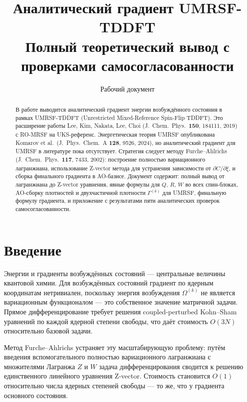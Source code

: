 \documentclass[11pt, a4paper]{article}
\title{\Large\bfseries Аналитический градиент UMRSF-TDDFT\\[4pt]
       \large Полный теоретический вывод с проверками самосогласованности}
\author{Рабочий документ}
\date{}
\theoremstyle{definition}
\begin{document}
\maketitle

\begin{abstract}
\noindent
В работе выводится аналитический градиент энергии возбуждённого состояния в рамках UMRSF-TDDFT (Unrestricted Mixed-Reference Spin-Flip TDDFT). Это расширение работы Lee, Kim, Nakata, Lee, Choi (J.\ Chem.\ Phys.\ \textbf{150}, 184111, 2019) с RO-MRSF на UKS-референс. Энергетическая теория UMRSF опубликована Komarov et al.\ (J.\ Phys.\ Chem.\ A \textbf{128}, 9526, 2024), но аналитический градиент для UMRSF в литературе пока отсутствует. Стратегия следует методу Furche--Ahlrichs (J.\ Chem.\ Phys.\ \textbf{117}, 7433, 2002): построение полностью вариационного лагранжиана, использование Z-vector метода для устранения зависимости от $\partial C/\partial\xi$, и сборка финального градиента в AO-базисе. Документ содержит: полный вывод от лагранжиана до Z-vector уравнения, явные формулы для $Q$, $R$, $W$ во всех спин-блоках, AO-сборку плотностей и двухчастичной плотности $\Gamma^{(k)}$ для UMRSF, финальную формулу градиента, и приложение с результатами пяти аналитических проверок самосогласованности.
\end{abstract}

\tableofcontents
\clearpage

\section{Введение}

Энергии и градиенты возбуждённых состояний — центральные величины квантовой химии. Для возбуждённых состояний градиент по ядерным координатам нетривиален, поскольку энергия возбуждения $\Omega^{(k)}$ не является вариационным функционалом — это собственное значение матричной задачи. Прямое дифференцирование требует решения coupled-perturbed Kohn--Sham уравнений по каждой ядерной степени свободы, что даёт стоимость $O(3N)$ относительно базовой задачи.

Метод Furche--Ahlrichs устраняет эту масштабирующую проблему: путём введения вспомогательного полностью вариационного лагранжиана с множителями Лагранжа $Z$ и $W$ задача дифференцирования сводится к решению единственного линейного уравнения Z-vector. Стоимость становится $O(1)$ относительно числа ядерных степеней свободы --- то же, что у градиента основного состояния.
\end{document}
